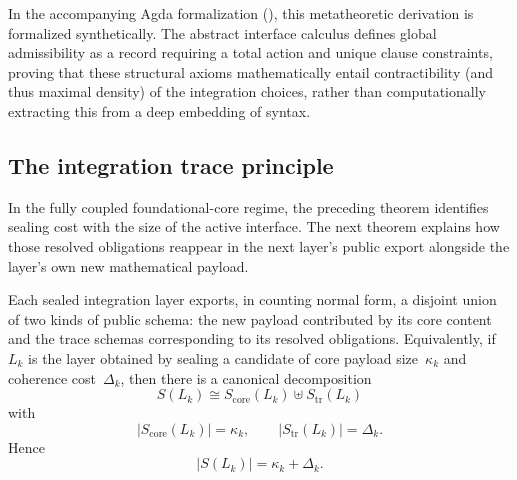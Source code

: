 \documentclass{lmcs}
\begin{document}
\begin{rem}
In the accompanying Agda formalization (), this metatheoretic derivation is formalized synthetically. The abstract interface calculus defines global admissibility as a record requiring a total action and unique clause constraints, proving that these structural axioms mathematically entail contractibility (and thus maximal density) of the integration choices, rather than computationally extracting this from a deep embedding of syntax.
\end{rem}

\subsection{The integration trace principle}

In the fully coupled foundational-core regime, the preceding theorem identifies sealing cost with the size of the active interface. The next theorem explains how those resolved obligations reappear in the next layer's public export alongside the layer's own new mathematical payload.

\begin{thm}
\label{thm:trace}
Each sealed integration layer exports, in counting normal form, a disjoint union of two kinds of public schema: the new payload contributed by its core content and the trace schemas corresponding to its resolved obligations. Equivalently, if $L_k$ is the layer obtained by sealing a candidate of core payload size~$\kappa_k$ and coherence cost~$\Delta_k$, then there is a canonical decomposition
\[
  S(L_k) \cong S_{\mathrm{core}}(L_k) \uplus S_{\mathrm{tr}}(L_k)
\]
with
\[
  |S_{\mathrm{core}}(L_k)| = \kappa_k,
  \qquad
  |S_{\mathrm{tr}}(L_k)| = \Delta_k.
\]
Hence
\[
  |S(L_k)| = \kappa_k + \Delta_k.
\]
\end{thm}
\end{document}
